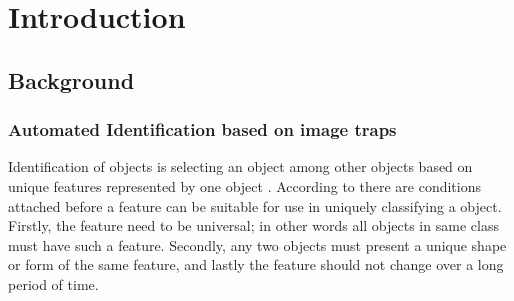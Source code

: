 %
%
%

\chapter{Introduction} %


\newcommand{\keyword}[1]{\textbf{#1}}
\newcommand{\tabhead}[1]{\textbf{#1}}
\newcommand{\code}[1]{\texttt{#1}}
\newcommand{\file}[1]{\texttt{\bfseries#1}}
\newcommand{\option}[1]{\texttt{\itshape#1}}


\section{Background} %

\subsection{Automated Identification based on image traps}

Identification of objects is selecting an object among other objects based on unique features represented by one object \cite{jain2007handbook}. According to \citeauthor{jain2004introduction} \citeyear{jain2004introduction} \cite{jain2004introduction} there are conditions attached before a feature can be suitable for use in uniquely classifying a object. Firstly, the feature need to be universal; in other words all objects in same class must have such a feature. Secondly, any two objects must present a unique shape or form of the same feature, and lastly the feature should not change over a long period of time.

